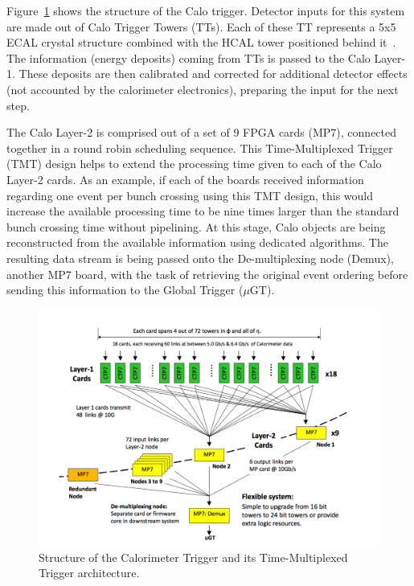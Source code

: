 \hspace{10pt} Figure~\ref{fig:l1_calo_trig} shows the structure of the Calo trigger. Detector inputs for this system are made out of Calo Trigger Towers (TTs). Each of these TT represents a 5x5 ECAL crystal structure combined with the HCAL tower positioned behind it~\cite{cms:l1_paper}. The information (energy deposits) coming from TTs is passed to the Calo Layer-1. These deposits are then calibrated and corrected for additional detector effects (not accounted by the calorimeter electronics), preparing the input for the next step.

\hspace{10pt} The Calo Layer-2 is comprised out of a set of 9 FPGA cards (MP7), connected together in a round robin scheduling sequence. This Time-Multiplexed Trigger (TMT) design helps to extend the processing time given to each of the Calo Layer-2 cards. As an example, if each of the boards received information regarding one event per bunch crossing using this TMT design, this would increase the available processing time to be nine times larger than the standard bunch crossing time without pipelining. At this stage, Calo objects are being reconstructed from the available information using dedicated algorithms. The resulting data stream is being passed onto the De-multiplexing node (Demux), another MP7 board, with the task of retrieving the original event ordering before sending this information to the Global Trigger ($\mu$GT).
\begin{figure}[htbp]
  \centering
    \includegraphics[width=\textwidth]{CMS_experiment/L1_calo_trig.png}
  \caption{Structure of the Calorimeter Trigger and its Time-Multiplexed Trigger architecture.~\cite{cms:l1_paper}}
  \label{fig:l1_calo_trig}
\end{figure}

